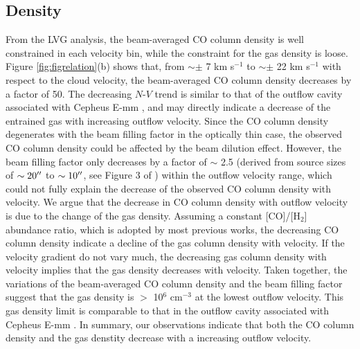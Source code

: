 \subsection{Density}\label{subsec:density}
From the LVG analysis, the beam-averaged CO column density is well constrained in each velocity bin, while the constraint for the gas density is loose. Figure \ref{fig:figrelation}(b) shows that, from $\sim \pm$ 7 km s$^{-1}$ to $\sim \pm$ 22 km s$^{-1}$ with respect to the cloud velocity, the beam-averaged CO column density decreases by a factor of 50. The decreasing $N$-$V$ trend is similar to that of the outflow cavity associated with Cepheus E-mm \citep{2015A&A...581A...4L}, and may directly indicate a decrease of the entrained gas with increasing outflow velocity. Since the CO column density degenerates with the beam filling factor in the optically thin case, the observed CO column density could be affected by the beam dilution effect. However, the beam filling factor only decreases by a factor of $\sim$ 2.5 (derived from source sizes of $\sim 20\mbox{$^{\prime\prime}$}$ to $\sim 10\mbox{$^{\prime\prime}$}$, see Figure 3 of \citet{2009ApJ...696...66Q}) within the outflow velocity range, which could not fully explain the decrease of the observed CO column density with velocity. We argue that the decrease in CO column density with outflow velocity is due to the change of the gas density. Assuming a constant [CO]/[H$_2$] abundance ratio, which is adopted by most previous works, the decreasing CO column density indicate a decline of the gas column density with velocity. If the velocity gradient do not vary much, the decreasing gas column density with velocity implies that the gas density decreases with velocity. Taken together, the variations of the beam-averaged CO column density and the beam filling factor suggest that the gas density is $>$ 10$^6$ cm$^{-3}$ at the lowest outflow velocity. This gas density limit is comparable to that in the outflow cavity associated with Cepheus E-mm \citep[Several times of 10$^5$ cm$^{-3}$:][]{2015A&A...581A...4L}. In summary, our observations indicate that both the CO column density and the gas denstity decrease with a increasing outflow velocity.

